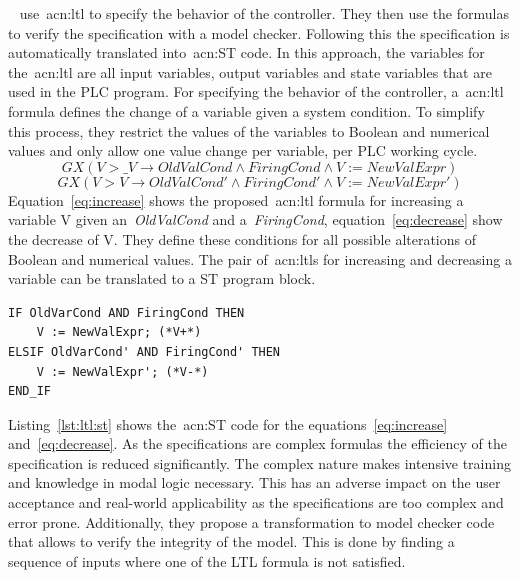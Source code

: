\citeauthor{Kuzmin:2013}~\cite{Kuzmin:2013} use~\acrshort{acn:ltl} to specify the behavior of the controller.
They then use the formulas to verify the specification with a model checker.
Following this the specification is  automatically translated into~\acrshort{acn:ST} code.
In this approach, the variables for the~\acrshort{acn:ltl} are all input variables, output variables and state variables that are used in the PLC program.
For specifying the behavior of the controller, a~\acrfull{acn:ltl} formula defines the change of a variable given a system condition.
To simplify this process, they restrict the values of the variables to Boolean and numerical values and only allow one value change per variable, per PLC working cycle.
\begin{equation}
GX\left(V > \_V \rightarrow OldValCond \land FiringCond \land V := NewValExpr \right)
\label{eq:increase}
\end{equation}
\begin{equation}
GX\left(V > V \rightarrow OldValCond' \land FiringCond' \land V := NewValExpr' \right)
\label{eq:decrease}
\end{equation}
Equation~\ref{eq:increase} shows the proposed~\acrshort{acn:ltl} formula for increasing a variable V given an~\textit{OldValCond} and a~\textit{FiringCond}, equation~\ref{eq:decrease} show the decrease of V.
They define these conditions for all possible alterations of Boolean and numerical values.
The pair of~\acrshort{acn:ltl}s for increasing and decreasing a variable can be translated to a ST program block.
\lstset{language=Pascal}
\begin{lstlisting}[caption={
Auto-generated~\gls{acn:ST} code realizing the~\acrshort{acn:ltl} formulas~\ref{eq:decrease} and~\ref{eq:increase}.~\cite{Kuzmin:2013}},label=lst:ltl:st]
IF OldVarCond AND FiringCond THEN
    V := NewValExpr; (*V+*)
ELSIF OldVarCond' AND FiringCond' THEN
    V := NewValExpr'; (*V-*)
END_IF
\end{lstlisting}
Listing~\ref{lst:ltl:st} shows the~\acrshort{acn:ST} code for the equations~\ref{eq:increase} and~\ref{eq:decrease}.
As the specifications are complex formulas the efficiency of the specification is reduced significantly.
The complex nature makes intensive training and knowledge in modal logic necessary.
This has an adverse impact on the user acceptance and real-world applicability as the specifications are too complex and error prone.
Additionally, they propose a transformation to model checker code that allows to verify the integrity of the model.
This is done by finding a sequence of inputs where one of the LTL formula is not satisfied.
